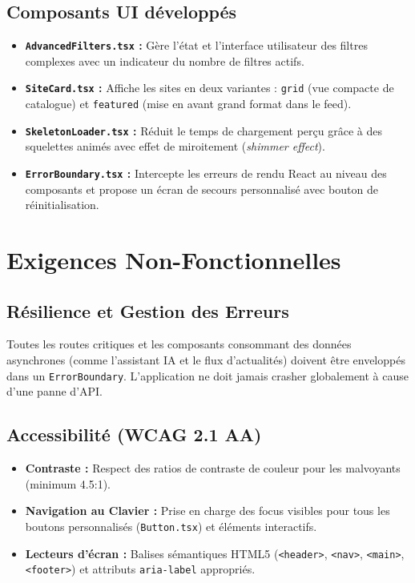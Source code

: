 \documentclass[11pt,a4paper]{article}
\begin{document}
\subsection{Composants UI développés}
\begin{itemize}
    \item \textbf{\texttt{AdvancedFilters.tsx} :} Gère l'état et l'interface utilisateur des filtres complexes avec un indicateur du nombre de filtres actifs.
    \item \textbf{\texttt{SiteCard.tsx} :} Affiche les sites en deux variantes : \texttt{grid} (vue compacte de catalogue) et \texttt{featured} (mise en avant grand format dans le feed).
    \item \textbf{\texttt{SkeletonLoader.tsx} :} Réduit le temps de chargement perçu grâce à des squelettes animés avec effet de miroitement (\textit{shimmer effect}).
    \item \textbf{\texttt{ErrorBoundary.tsx} :} Intercepte les erreurs de rendu React au niveau des composants et propose un écran de secours personnalisé avec bouton de réinitialisation.
\end{itemize}

\section{Exigences Non-Fonctionnelles}

\subsection{Résilience et Gestion des Erreurs}
\begin{tcolorbox}[colback=red!5,colframe=red!50!black,title=Zéro Écran Blanc (White Screen of Death)]
    Toutes les routes critiques et les composants consommant des données asynchrones (comme l'assistant IA et le flux d'actualités) doivent être enveloppés dans un \texttt{ErrorBoundary}. L'application ne doit jamais crasher globalement à cause d'une panne d'API.
\end{tcolorbox}

\subsection{Accessibilité (WCAG 2.1 AA)}
\begin{itemize}
    \item \textbf{Contraste :} Respect des ratios de contraste de couleur pour les malvoyants (minimum 4.5:1).
    \item \textbf{Navigation au Clavier :} Prise en charge des focus visibles pour tous les boutons personnalisés (\texttt{Button.tsx}) et éléments interactifs.
    \item \textbf{Lecteurs d'écran :} Balises sémantiques HTML5 (\texttt{<header>}, \texttt{<nav>}, \texttt{<main>}, \texttt{<footer>}) et attributs \texttt{aria-label} appropriés.
\end{itemize}
\end{document}
